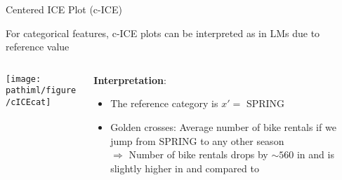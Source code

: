 \documentclass[11pt,compress,t,notes=noshow, aspectratio=169, xcolor=table]{beamer}
\newcommand{\pathiml}{../../slides/03_feature-effects/}
\begin{document}
\begin{frame}{Centered ICE Plot (c-ICE)}

For categorical features, c-ICE plots can be interpreted as in LMs due to reference value

\begin{columns}[c]
\begin{column}{0.44\textwidth}

\begin{center}
\texttt{[image: \\pathiml/figure/cICEcat]}
\end{center}

\end{column}
\begin{column}{0.55\textwidth}

\textbf{Interpretation}: \\
\begin{itemize}
\item The reference category is $x' =$ SPRING
\item Golden crosses: Average number of bike rentals if we jump from SPRING to any other season\\
$\Rightarrow$ Number of bike rentals drops by $\sim 560$ in  and is slightly higher in  and  compared to 
\end{itemize}

\end{column}
\end{columns}

\end{frame}




\renewcommand{\titlefigure}{\pathiml/figure/ale_plot.pdf}
\renewcommand{\learninggoals}{
\item PD plots and its extrapolation issue
\item M plots and its omitted-variable bias
\item Understand ALE plots
}
\end{document}
